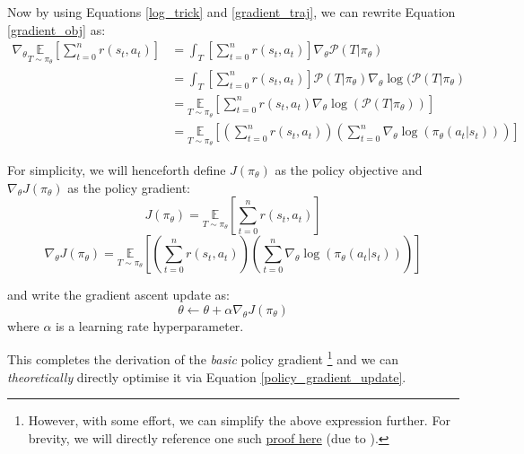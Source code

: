 \documentclass{article} %
\begin{document}
Now by using Equations \eqref{log_trick} and \eqref{gradient_traj}, we can rewrite Equation \eqref{gradient_obj} as:
\begin{equation} \label{gradient_obj_rewritten}
    \begin{aligned}
    \nabla_\theta \underset{T \sim \pi_\theta}{\mathbb{E}} \left[ \sum_{t=0}^{n} r(s_t, a_t) \right] 
        &= \int_{T} \left[\sum_{t=0}^{n} r(s_t, a_t) \right] \nabla_\theta \mathcal{P}(T | \pi_\theta) \\
        &= \int_{T} \left[\sum_{t=0}^{n} r(s_t, a_t) \right] \mathcal{P}(T | \pi_\theta) \nabla_\theta \log(\mathcal{P}(T | \pi_\theta) \\
        &= \underset{T \sim \pi_\theta}{\mathbb{E}} \left[ \sum_{t=0}^{n} r(s_t, a_t) \nabla_\theta \log(\mathcal{P}(T | \pi_\theta)) \right] \\
        &= \underset{T \sim \pi_\theta}{\mathbb{E}} \left[ \left(\sum_{t=0}^{n} r(s_t, a_t)\right) \left( \sum_{t=0}^{n} \nabla_\theta \log(\pi_\theta(a_t | s_t)) \right) \right]
    \end{aligned}
\end{equation}

For simplicity, we will henceforth define $J(\pi_\theta)$ as the policy objective and $\nabla_\theta J(\pi_\theta)$ as the policy gradient:
\begin{equation} \label{policy_objective}
    J(\pi_\theta) = \underset{T \sim \pi_\theta}{\mathbb{E}} \left[ \sum_{t=0}^{n} r(s_t, a_t) \right]
\end{equation}
\begin{equation} \label{policy_gradient}
    \nabla_\theta J(\pi_\theta) = \underset{T \sim \pi_\theta}{\mathbb{E}} \left[ \left(\sum_{t=0}^{n} r(s_t, a_t)\right) \left( \sum_{t=0}^{n} \nabla_\theta \log(\pi_\theta(a_t | s_t)) \right) \right]
\end{equation}

and write the gradient ascent update as:
\begin{equation} \label{policy_gradient_update}
    \theta \leftarrow \theta + \alpha \nabla_\theta J(\pi_\theta)
\end{equation} 
where $\alpha$ is a learning rate hyperparameter.

This completes the derivation of the \textit{basic} policy gradient \footnote{
However, with some effort, we can simplify the above expression further.
For brevity, we will directly reference one such \href{https://spinningup.openai.com/en/latest/spinningup/extra_pg_proof1.html}{proof here} (due to \cite{SpinningUp-2018}).
}
and we can \textit{theoretically} directly optimise it via Equation \eqref{policy_gradient_update}.
\end{document}
